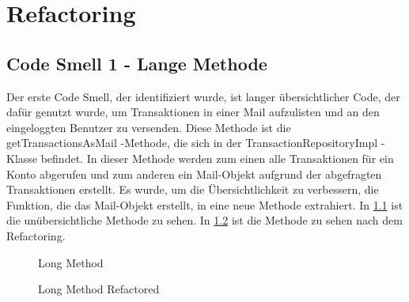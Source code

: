\chapter{Refactoring}
\section{Code Smell 1 - Lange Methode}
Der erste Code Smell, der identifiziert wurde, ist langer übersichtlicher Code, der dafür genutzt wurde, um Transaktionen in einer Mail aufzulisten und an den eingeloggten Benutzer zu versenden. 
Diese Methode ist die \glqq getTransactionsAsMail \grqq -Methode, die sich in der \glqq TransactionRepositoryImpl \grqq -Klasse befindet.
In dieser Methode werden zum einen alle Transaktionen für ein Konto abgerufen und zum anderen ein Mail-Objekt aufgrund der abgefragten Transaktionen erstellt. Es wurde, um die Übersichtlichkeit zu 
verbessern, die Funktion, die das Mail-Objekt erstellt, in eine neue Methode extrahiert. In \ref{codeSmell1} ist die unübersichtliche Methode zu sehen. In \ref{codeSmell1Nachher} ist die Methode zu sehen nach dem Refactoring.
\begin{figure}[htbp]
    \centering
    \caption{\label{codeSmell1} Long Method}
\end{figure}
\begin{figure}[htbp]
    \centering
    \caption{\label{codeSmell1Nachher} Long Method Refactored}
\end{figure}
